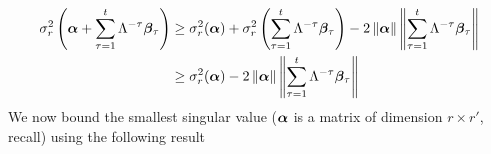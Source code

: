 \documentclass[10pt]{article}
\newtheorem{theorem}{Theorem}
\newcommand{\norm}[1]{\left\|#1\right\|}
\begin{document}
\begin{align*}
\sigma_r^2\left(\ucos + \sum_{\tau=1}^t \Lambda^{-\tau} \wcos_\tau\right) &\geq \sigma_r^2(\ucos) + \sigma_r^2\left(\sum_{\tau=1}^t \Lambda^{-\tau} \wcos_\tau \right) - 2\norm{\ucos}\norm{\sum_{\tau=1}^t \Lambda^{-\tau} \wcos_\tau} \\
&\geq \sigma_r^2(\ucos) - 2\norm{\ucos}\norm{\sum_{\tau=1}^t \Lambda^{-\tau} \wcos_\tau}
\end{align*}
We now bound the smallest singular value ($\bm{\alpha}$ is a matrix of dimension $r \times r'$, recall) using the following result 
\cite[Theorem 1.1]{smallest_rect}
\end{document}
